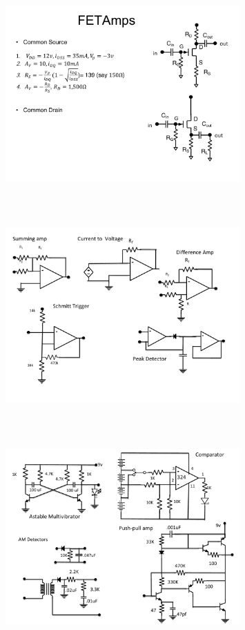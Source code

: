 \begin{figure} 
\center
\includegraphics[width=0.8\textwidth,natwidth=642,natheight=610, height=80mm, width=88mm]{circuit11.pdf}
\end{figure}
\begin{figure} 
\center
\includegraphics[width=0.8\textwidth,natwidth=642,natheight=610, height=80mm, width=88mm]{circuit12.pdf}
\end{figure}
\begin{figure} 
\center
\includegraphics[width=0.8\textwidth,natwidth=642,natheight=610, height=80mm, width=88mm]{circuit13.pdf}
\end{figure}
